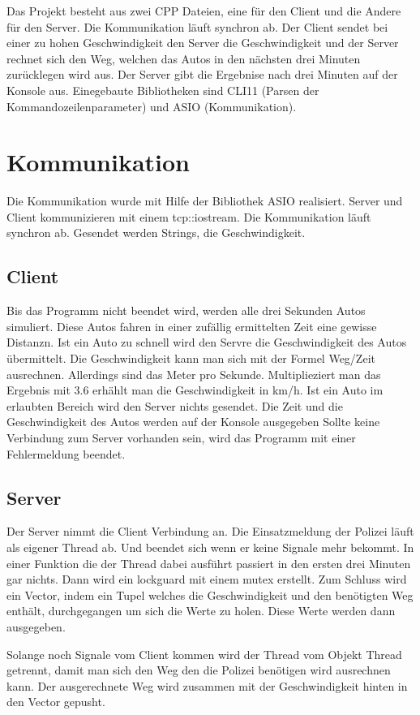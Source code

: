 \documentclass[12pt,a4paper]{scrartcl}
\begin{document}
Das Projekt besteht aus zwei CPP Dateien, eine für den Client und die 
Andere für den Server. Die Kommunikation läuft synchron ab. Der Client sendet
bei einer zu hohen Geschwindigkeit den Server die Geschwindigkeit und der Server rechnet sich
den Weg, welchen das Autos in den nächsten drei Minuten zurücklegen wird aus. Der Server gibt die Ergebnise nach
drei Minuten auf der Konsole aus.
Einegebaute Bibliotheken sind CLI11 (Parsen der Kommandozeilenparameter) und ASIO (Kommunikation).

\section{Kommunikation}
\label{sec:Kommunikation}

Die Kommunikation wurde mit Hilfe der Bibliothek ASIO realisiert. Server und Client 
kommunizieren mit einem tcp::iostream. Die Kommunikation läuft synchron ab. Gesendet werden Strings, die Geschwindigkeit.


\subsection{Client}
\label{subsec:Client}

Bis das Programm nicht beendet wird, werden alle drei Sekunden Autos simuliert. Diese Autos fahren in einer zufällig ermittelten Zeit
eine gewisse Distanzn. Ist ein Auto zu schnell wird den Servre die Geschwindigkeit des Autos übermittelt. Die Geschwindigkeit kann man sich 
mit der Formel Weg/Zeit ausrechnen. Allerdings sind das Meter pro Sekunde. Multiplieziert man das Ergebnis mit 3.6 erhählt man die Geschwindigkeit
in km/h. 
Ist ein Auto im erlaubten Bereich wird den Server nichts gesendet.
Die Zeit und die Geschwindigkeit des Autos werden auf der Konsole ausgegeben
Sollte keine Verbindung zum Server vorhanden sein, wird das Programm mit einer Fehlermeldung beendet.
\subsection{Server}
\label{subsec:Server}

Der Server nimmt die Client Verbindung an. Die Einsatzmeldung der Polizei läuft als eigener Thread ab. Und beendet sich wenn er keine Signale mehr bekommt.
In einer Funktion die der Thread dabei ausführt passiert in den ersten drei Minuten gar nichts. Dann wird ein lockguard mit einem mutex erstellt. Zum Schluss wird ein Vector,
indem ein Tupel welches die Geschwindigkeit und den benötigten Weg enthält, durchgegangen um sich die Werte zu holen. Diese Werte werden dann ausgegeben.

Solange noch Signale vom Client kommen wird der Thread vom Objekt Thread getrennt, damit man sich den Weg den die Polizei benötigen wird
ausrechnen kann. Der ausgerechnete Weg wird zusammen mit der Geschwindigkeit hinten in den Vector gepusht.
\end{document}
